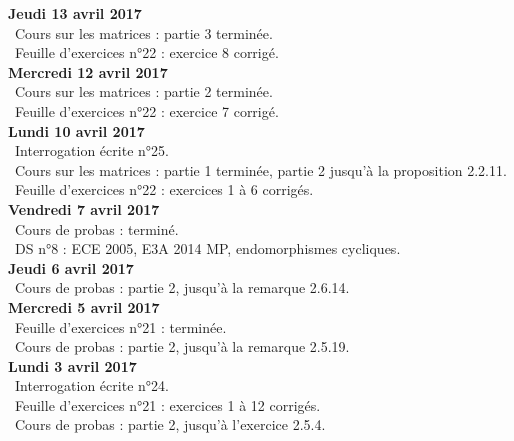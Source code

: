 \documentclass[12pt,a4paper]{article}
\begin{document}
\noindent\textbf{Jeudi 13 avril 2017}\\
\bu\ Cours sur les matrices : partie 3 terminée.\\
\bu\ Feuille d'exercices n°22 : exercice 8 corrigé.\vspace{.4cm}\\

\noindent\textbf{Mercredi 12 avril 2017}\\
\bu\ Cours sur les matrices : partie 2 terminée.\\
\bu\ Feuille d'exercices n°22 : exercice 7 corrigé.\vspace{.4cm}\\

\noindent\textbf{Lundi 10 avril 2017}\\
\bu\ Interrogation écrite n°25.\\
\bu\ Cours sur les matrices : partie 1 terminée, partie 2 jusqu'à la proposition 2.2.11.\\
\bu\ Feuille d'exercices n°22 : exercices 1 à 6 corrigés.\vspace{.4cm}\\

\noindent\textbf{Vendredi 7 avril 2017}\\
\bu\ Cours de probas : terminé.\\
\bu\ DS n°8 : ECE 2005, E3A 2014 MP, endomorphismes cycliques.\vspace{.4cm}\\

\noindent\textbf{Jeudi 6 avril 2017}\\
\bu\ Cours de probas : partie 2, jusqu'à la remarque 2.6.14.\vspace{.4cm}\\

\noindent\textbf{Mercredi 5 avril 2017}\\
\bu\ Feuille d'exercices n°21 : terminée.\\
\bu\ Cours de probas : partie 2, jusqu'à la remarque 2.5.19.\vspace{.4cm}\\

\noindent\textbf{Lundi 3 avril 2017}\\
\bu\ Interrogation écrite n°24.\\
\bu\ Feuille d'exercices n°21 : exercices 1 à 12 corrigés.\\
\bu\ Cours de probas : partie 2, jusqu'à l'exercice 2.5.4.\vspace{.4cm}\\
\end{document}
